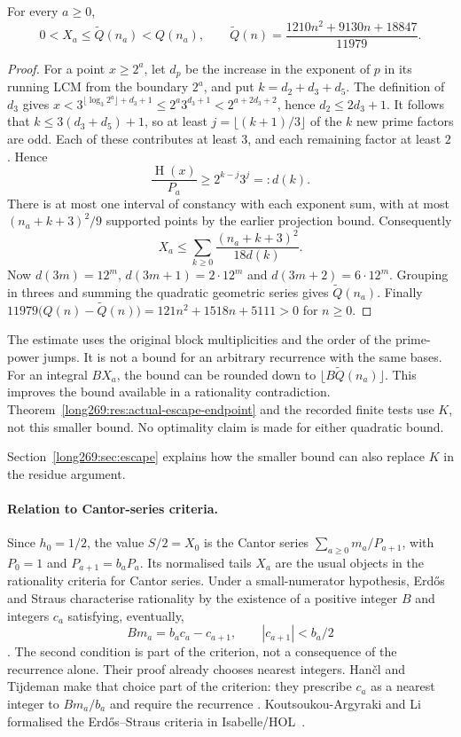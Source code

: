 \documentclass[11pt]{article}
\theoremstyle{remark}
\theoremstyle{plain}
\newcommand{\hgt}{\operatorname{H}}
\begin{document}
\begin{proposition}
\label{long269:res:jump-constrained-bound}
For every $a\ge0$,
\[
 0<X_a\le\widetilde Q(n_a)<Q(n_a),\qquad
 \widetilde Q(n)=\frac{1210n^2+9130n+18847}{11979}.
\]
\end{proposition}
\begin{proof}
For a point $x\ge2^a$, let $d_p$ be the increase in the exponent of $p$ in its running LCM
from the boundary $2^a$, and put $k=d_2+d_3+d_5$.
The definition of $d_3$ gives
$x<3^{\lfloor\log_3 2^a\rfloor+d_3+1}\le2^a3^{d_3+1}
<2^{a+2d_3+2}$, hence $d_2\le2d_3+1$.
It follows that $k\le3(d_3+d_5)+1$, so at least
$j=\lfloor(k+1)/3\rfloor$ of the $k$ new prime factors are odd.
Each of these contributes at least $3$, and each remaining factor at
least $2$.  Hence
\[
 \frac{\hgt(x)}{P_a}\ge2^{k-j}3^j=:d(k).
\]
There is at most one interval of constancy with each exponent sum, with at most
$(n_a+k+3)^2/9$ supported points by the earlier projection bound.
Consequently
\[
 X_a\le\sum_{k\ge0}\frac{(n_a+k+3)^2}{18d(k)}.
\]
Now $d(3m)=12^m$, $d(3m+1)=2\cdot12^m$ and
$d(3m+2)=6\cdot12^m$.  Grouping in threes and summing the quadratic
geometric series gives $\widetilde Q(n_a)$.
Finally $11979\bigl(Q(n)-\widetilde Q(n)\bigr)
=121n^2+1518n+5111>0$ for $n\ge0$.
\end{proof}
The estimate uses the original block multiplicities and the order of
the prime-power jumps.  It is not a bound for an arbitrary recurrence
with the same bases.  For an integral $BX_a$, the bound can be
rounded down to $\lfloor B\widetilde Q(n_a)\rfloor$.  This improves the
bound available in a rationality contradiction.
Theorem~\ref{long269:res:actual-escape-endpoint} and the recorded finite
tests use $K$, not this smaller bound.  No optimality claim is made for
either quadratic bound.

Section~\ref{long269:sec:escape} explains how the smaller bound can also
replace $K$ in the residue argument.

\paragraph{Relation to Cantor-series criteria.}
Since $h_0=1/2$, the value $S/2=X_0$ is the Cantor series
$\sum_{a\ge0}m_a/P_{a+1}$, with $P_0=1$ and $P_{a+1}=b_aP_a$.
Its normalised tails $X_a$ are the usual objects in the rationality
criteria for Cantor series.  Under a small-numerator hypothesis,
Erd\H{o}s and Straus characterise rationality by the existence of a
positive integer $B$ and integers $c_a$ satisfying, eventually,
\[
 Bm_a=b_ac_a-c_{a+1},\qquad |c_{a+1}|<b_a/2
\]
\cite[Theorem~2.1 and (2.4), pp.~85--86]{erdosstraus1974}.
The second condition is part of the criterion, not a consequence of the
recurrence alone.  Their proof already chooses nearest integers.
Han\v{c}l and Tijdeman make that choice part of the criterion: they
prescribe $c_a$ as a nearest integer to $Bm_a/b_a$ and require the recurrence
\cite[\S\S2--3 and Theorem~3.1, pp.~372--375]{hancltijdeman2004}.
Koutsoukou-Argyraki and Li formalised the Erd\H{o}s--Straus criteria in
Isabelle/HOL~\cite{afperdosstraus2020}.
\end{document}
